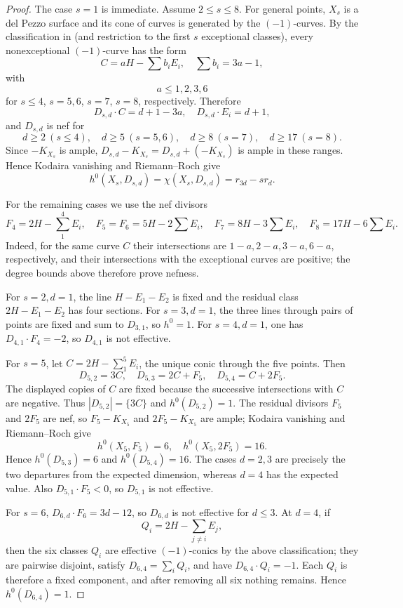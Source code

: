 \documentclass[11pt]{amsart}
\theoremstyle{remark}
\begin{document}
\begin{proof}
The case $s=1$ is immediate. Assume $2\le s\le8$. For general points, $X_s$ is a del Pezzo surface and its cone of curves is generated by the $(-1)$-curves. By the classification in \cite[Lemma~3]{FHH} (and restriction to the first $s$ exceptional classes), every nonexceptional $(-1)$-curve has the form
$$
C=aH-\sum b_iE_i,
\quad
\sum b_i=3a-1,
$$
with
$$
a\le1,2,3,6
$$
for $s\le4$, $s=5,6$, $s=7$, $s=8$, respectively. Therefore
$$
D_{s,d}\cdot C=d+1-3a,
\quad
D_{s,d}\cdot E_i=d+1,
$$
and $D_{s,d}$ is nef for
$$
d\ge2\ (s\le4),
\quad d\ge5\ (s=5,6),
\quad d\ge8\ (s=7),
\quad d\ge17\ (s=8).
$$
Since $-K_{X_s}$ is ample, $D_{s,d}-K_{X_s}=D_{s,d}+(-K_{X_s})$ is ample in these ranges. Hence Kodaira vanishing and Riemann--Roch give
$$
h^0(X_s,D_{s,d})=\chi(X_s,D_{s,d})=r_{3d}-sr_d.
$$

For the remaining cases we use the nef divisors
$$
F_4=2H-\sum_{1}^{4}E_i,
\quad
F_5=F_6=5H-2\sum E_i,
\quad
F_7=8H-3\sum E_i,
\quad
F_8=17H-6\sum E_i.
$$
Indeed, for the same curve $C$ their intersections are $1-a,2-a,3-a,6-a$, respectively, and their intersections with the exceptional curves are positive; the degree bounds above therefore prove nefness.

For $s=2,d=1$, the line $H-E_1-E_2$ is fixed and the residual class $2H-E_1-E_2$ has four sections. For $s=3,d=1$, the three lines through pairs of points are fixed and sum to $D_{3,1}$, so $h^0=1$. For $s=4,d=1$, one has $D_{4,1}\cdot F_4=-2$, so $D_{4,1}$ is not effective.

For $s=5$, let $C=2H-\sum_{1}^{5}E_i$, the unique conic through the five points. Then
$$
D_{5,2}=3C,
\quad
D_{5,3}=2C+F_5,
\quad
D_{5,4}=C+2F_5.
$$
The displayed copies of $C$ are fixed because the successive intersections with $C$ are negative. Thus $|D_{5,2}|=\{3C\}$ and $h^0(D_{5,2})=1$. The residual divisors $F_5$ and $2F_5$ are nef, so $F_5-K_{X_5}$ and $2F_5-K_{X_5}$ are ample; Kodaira vanishing and Riemann--Roch give
$$
h^0(X_5,F_5)=6,
\quad
h^0(X_5,2F_5)=16.
$$
Hence $h^0(D_{5,3})=6$ and $h^0(D_{5,4})=16$. The cases $d=2,3$ are precisely the two departures from the expected dimension, whereas $d=4$ has the expected value. Also $D_{5,1}\cdot F_5<0$, so $D_{5,1}$ is not effective.

For $s=6$, $D_{6,d}\cdot F_6=3d-12$, so $D_{6,d}$ is not effective for $d\le3$. At $d=4$, if
$$
Q_i=2H-\sum_{j\ne i}E_j,
$$
then the six classes $Q_i$ are effective $(-1)$-conics by the above classification; they are pairwise disjoint, satisfy $D_{6,4}=\sum_iQ_i$, and have $D_{6,4}\cdot Q_i=-1$. Each $Q_i$ is therefore a fixed component, and after removing all six nothing remains. Hence $h^0(D_{6,4})=1$.


\end{proof}
\end{document}
